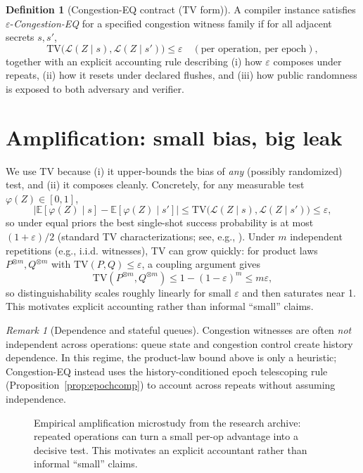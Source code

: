 \documentclass[11pt]{article}
\theoremstyle{definition}
\newtheorem{definition}{Definition}
\theoremstyle{remark}
\newtheorem{remark}{Remark}
\newcommand{\TV}{\mathrm{TV}}
\newcommand{\eps}{\varepsilon}
\newcommand{\E}{\mathbb{E}}
\begin{document}
\begin{definition}[Congestion-EQ contract (TV form)]
A compiler instance satisfies \(\eps\)-\emph{Congestion-EQ} for a specified congestion witness family if for all adjacent secrets \(s,s'\),
\[
\TV\big(\mathcal{L}(Z\mid s),\mathcal{L}(Z\mid s')\big) \le \eps\quad (\text{per operation, per epoch}),
\]
\noindent together with an explicit accounting rule describing (i) how \(\eps\) composes under repeats, (ii) how it resets under declared flushes, and (iii) how public randomness is exposed to both adversary and verifier.
\end{definition}

\section{Amplification: small bias, big leak}\label{sec:amplification}
We use TV because (i) it upper-bounds the bias of \emph{any} (possibly randomized) test, and (ii) it composes cleanly.
Concretely, for any measurable test $\varphi(Z)\in[0,1]$,
\[
\big|\E[\varphi(Z)\mid s]-\E[\varphi(Z)\mid s']\big| \le \TV\big(\mathcal{L}(Z\mid s),\mathcal{L}(Z\mid s')\big) \le \eps,
\]
so under equal priors the best single-shot success probability is at most $(1+\eps)/2$ (standard TV characterizations; see, e.g., \cite{levin_peres_wilmer}).
Under $m$ independent repetitions (e.g., i.i.d. witnesses), TV can grow quickly: for product laws $P^{\otimes m},Q^{\otimes m}$ with $\TV(P,Q)\le \eps$, a coupling argument gives
\[\TV(P^{\otimes m},Q^{\otimes m}) \le 1-(1-\eps)^m \le m\eps,\]
so distinguishability scales roughly linearly for small $\eps$ and then saturates near 1.
This motivates explicit accounting rather than informal ``small'' claims.

\begin{remark}[Dependence and stateful queues]
Congestion witnesses are often \emph{not} independent across operations: queue state and congestion control create history dependence.
In this regime, the product-law bound above is only a heuristic; Congestion-EQ instead uses the history-conditioned epoch telescoping rule (Proposition~\ref{prop:epochcomp}) to account across repeats without assuming independence.
\end{remark}

\begin{figure}[t]
\centering
{}
\caption{Empirical amplification microstudy from the research archive: repeated operations can turn a small per-op advantage into a decisive test.
This motivates an explicit accountant rather than informal ``small'' claims.}
\label{fig:amplification}
\end{figure}
\end{document}

